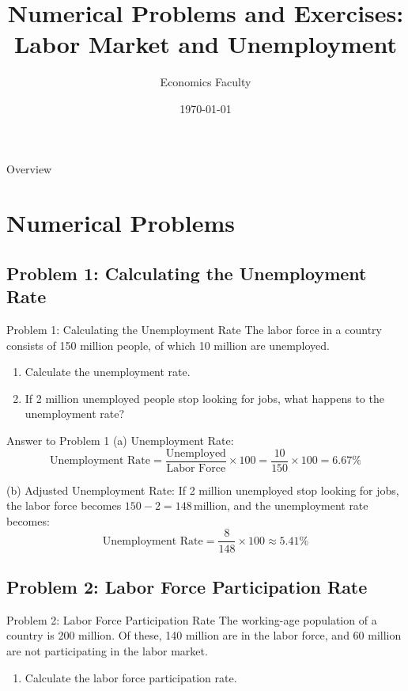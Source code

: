 \documentclass{beamer}
\title[Labor Market Exercises]{Numerical Problems and Exercises: Labor Market and Unemployment}
\author{Economics Faculty}
\date{\today}
\begin{document}
\begin{frame}
    \titlepage
\end{frame}

\begin{frame}{Overview}
    \tableofcontents
\end{frame}

\section{Numerical Problems}

\subsection{Problem 1: Calculating the Unemployment Rate}
\begin{frame}{Problem 1: Calculating the Unemployment Rate}
The labor force in a country consists of 150 million people, of which 10 million are unemployed.
\begin{enumerate}
    \item Calculate the unemployment rate.  
    \item If 2 million unemployed people stop looking for jobs, what happens to the unemployment rate?  
\end{enumerate}
\end{frame}

\begin{frame}{Answer to Problem 1}
(a) Unemployment Rate:
\[
\text{Unemployment Rate} = \frac{\text{Unemployed}}{\text{Labor Force}} \times 100 = \frac{10}{150} \times 100 = 6.67\%
\]

(b) Adjusted Unemployment Rate:  
If 2 million unemployed stop looking for jobs, the labor force becomes \(150 - 2 = 148 \, \text{million}\), and the unemployment rate becomes:
\[
\text{Unemployment Rate} = \frac{8}{148} \times 100 \approx 5.41\%
\]
\end{frame}

\subsection{Problem 2: Labor Force Participation Rate}
\begin{frame}{Problem 2: Labor Force Participation Rate}
The working-age population of a country is 200 million. Of these, 140 million are in the labor force, and 60 million are not participating in the labor market.
\begin{enumerate}
    \item Calculate the labor force participation rate.  
\end{enumerate}
\end{frame}
\end{document}
